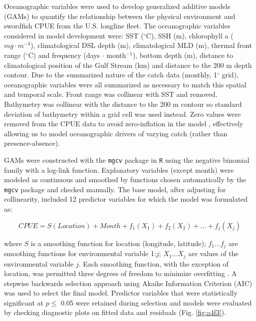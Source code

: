 Oceanographic variables were used to develop generalized additive models (GAMs) to quantify the relationship between the physical environment and swordfish CPUE from the U.S. longline fleet. The oceanographic variables considered in model development were: SST ($^{\circ}$C), SSH (m), chlorophyll a (\(mg \cdot m^{-3}\)), climatological DSL depth (m), climatological MLD (m), thermal front range ($^{\circ}$C) and frequency (days \(\cdot\) month\(^{-1}\)), bottom depth (m), distance to climatological position of the Gulf Stream (km) and distance to the 200 m depth contour. Due to the summarized nature of the catch data (monthly, 1$^{\circ}$ grid), oceanographic variables were all summarized as necessary to match this spatial and temporal scale. Front range was collinear with SST and removed. Bathymetry was collinear with the distance to the 200 m contour so standard deviation of bathymetry within a grid cell was used instead. Zero values were removed from the CPUE data to avoid zero-inflation in the model \citep{Zuur2009, Maunder2004}, effectively allowing us to model oceanographic drivers of varying catch (rather than presence-absence).

GAMs were constructed with the \texttt{mgcv} package \citep{Wood2006} in \texttt{R} using the negative binomial family with a log-link function. Explanatory variables (except month) were modeled as continuous and smoothed by functions chosen automatically by the \texttt{mgcv} package and checked manually. The base model, after adjusting for collinearity, included 12 predictor variables for which the model was formulated as:

\begin{equation}
CPUE = S(Location) + Month + f_1(X_1) + f_2(X_2) + ... + f_j(X_j)
\label{eq:gam}
\end{equation}

where \(S\) is a smoothing function for location (longitude, latitude); \(f_1...f_j\) are smoothing functions for environmental variable 1:\(j\); \(X_1...X_j\) are values of the environmental variable \(j\). Each smoothing function, with the exception of location, was permitted three degrees of freedom to minimize overfitting \citep{Rooker2012}. A stepwise backwards selection approach using Akaike Information Criterion (AIC) was used to select the final model. Predictor variables that were statistically significant at \(p \leq\) 0.05 were retained during selection and models were evaluated by checking diagnostic plots on fitted data and residuals (Fig. \cref{fig:a4f3}).

